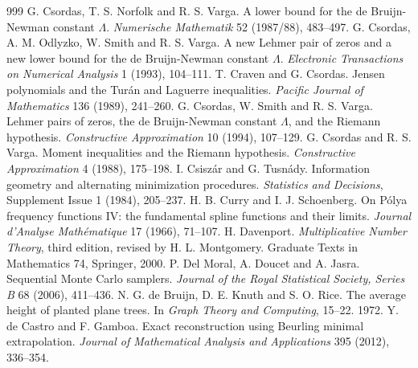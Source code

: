 \begin{thebibliography}{999}
 G. Csordas, T. S. Norfolk and R. S. Varga. A lower bound for the de Bruijn-Newman constant $\Lambda$. \emph{Numerische Mathematik} 52 (1987/88), 483--497. %
 G. Csordas, A. M. Odlyzko, W. Smith and R. S. Varga. A new Lehmer pair of zeros and a new lower bound for the de Bruijn-Newman constant $\Lambda$. \emph{Electronic Transactions on Numerical Analysis} 1 (1993), 104--111.
 T. Craven and G. Csordas. Jensen polynomials and the Tur\'an and Laguerre inequalities. \emph{Pacific Journal of Mathematics} 136 (1989), 241--260. %
 G. Csordas, W. Smith and R. S. Varga. Lehmer pairs of zeros, the de Bruijn-Newman constant $\Lambda$, and the Riemann hypothesis. \emph{Constructive Approximation} 10 (1994), 107--129.
 G. Csordas and R. S. Varga. Moment inequalities and the Riemann hypothesis. \emph{Constructive Approximation} 4 (1988), 175--198. %
 I. Csisz\'ar and G. Tusn\'ady. Information geometry and alternating minimization procedures. \emph{Statistics and Decisions}, Supplement Issue 1 (1984), 205--237.
 H. B. Curry and I. J. Schoenberg. On P\'olya frequency functions IV: the fundamental spline functions and their limits. \emph{Journal d'Analyse Math\'ematique} 17 (1966), 71--107.
 H. Davenport. \emph{Multiplicative Number Theory}, third edition, revised by H. L. Montgomery. Graduate Texts in Mathematics 74, Springer, 2000.
 P. Del Moral, A. Doucet and A. Jasra. Sequential Monte Carlo samplers. \emph{Journal of the Royal Statistical Society, Series B} 68 (2006), 411--436.
 N. G. de Bruijn, D. E. Knuth and S. O. Rice. The average height of planted plane trees. In \emph{Graph Theory and Computing}, 15--22. 1972.
 Y. de Castro and F. Gamboa. Exact reconstruction using Beurling minimal extrapolation. \emph{Journal of Mathematical Analysis and Applications} 395 (2012), 336--354.

\end{thebibliography}
